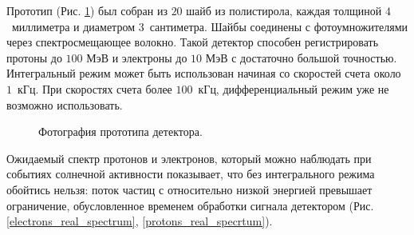 \documentclass{config}
\begin{document}
Прототип (Рис. \ref{detector_real_2}) был собран из $20$ шайб из полистирола, каждая толщиной $4$~миллиметра и диаметром $3$~сантиметра. Шайбы соединены с фотоумножителями через спектросмещающее волокно. Такой детектор способен регистрировать протоны до $100$ МэВ и электроны до $10$ МэВ с достаточно большой точностью. Интегральный режим может быть использован начиная со скоростей счета около $1$~кГц. При скоростях счета более $100$~кГц, дифференциальный режим уже не возможно использовать.

\begin{figure}[h!]
\caption{Фотография прототипа детектора.}
\label{detector_real_2}
\end{figure}

Ожидаемый спектр протонов и электронов, который можно наблюдать при событиях солнечной активности \cite{real_energy_spectrum} показывает, что без интегрального режима обойтись нельзя: поток частиц с относительно низкой энергией превышает ограничение, обусловленное временем обработки сигнала детектором (Рис. \ref{electrons_real_spectrum}, \ref{protons_real_specrtum}).
\end{document}
